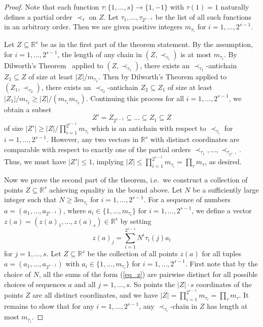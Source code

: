 \documentclass{aic}
\theoremstyle{definition}
\numberwithin{equation}{section}
\numberwithin{figure}{section}
\newcommand{\su}{\subseteq}
\begin{document}
\begin{proof}
Note that each function $\tau:\{1, \ldots, s\}\rightarrow \{1,-1\}$ with $\tau(1) = 1$ naturally defines a partial order $\prec_{\tau}$ on $Z$. Let $\tau_1, \ldots, \tau_{2^{s-1}}$ be the list of all such functions in an arbitrary order. Then we are given positive integers $m_{\tau_i}$ for $i=1,\dots,2^{s-1}$.

Let $Z \subseteq \mathbb R^s$ be as in the first part of the theorem statement. By the assumption, for $i=1,\dots,2^{s-1}$, the length of any chain in $(Z, \prec_{\tau_i})$ is at most $m_{\tau_i}$. 
 By Dilworth's Theorem~\cite{Dil} applied to $(Z, \prec_{\tau_1})$, there exists an $\prec_{\tau_1}$-antichain $Z_1 \subseteq Z$ of size at least $|Z| / m_{\tau_1}$. Then by Dilworth's Theorem applied to $(Z_1, \prec_{\tau_2})$, there exists an $\prec_{\tau_2}$-antichain $Z_2 \subseteq Z_1$ of size at least $|Z_1| / m_{\tau_2} \ge |Z|/(m_{\tau_1}m_{\tau_2})$. Continuing this process for all $i=1, \ldots, 2^{s-1}$, we obtain a subset
\[Z' = Z_{2^{s-1}} \subseteq \ldots \subseteq Z_1\su Z\]
of size $|Z'|\ge |Z|/\prod_{i=1}^{2^{s-1}} m_{\tau_i}$ which is an antichain with respect to $\prec_{\tau_i}$ for $i=1,\dots,2^{s-1}$. However, any two vectors in $\mathbb R^s$ with distinct coordinates are comparable with respect to exactly one of the partial orders $\prec_{\tau_1},\dots,\prec_{\tau_{2^{s-1}}}$. Thus, we must have $|Z'|\le 1$, implying $|Z|\le \prod_{i=1}^{2^{s-1}} m_{\tau_i}=\prod_\tau m_{\tau}$, as desired. 

Now we prove the second part of the theorem, i.e.\ we construct a collection of points $Z\su \mathbb{R}^s$ achieving equality in the bound above. Let $N$ be a sufficiently large integer such that $N\ge 3m_{\tau_i}$ for $i=1,\dots,2^{s-1}$. For a sequence of numbers $a = (a_1, \ldots, a_{2^{s-1}})$, where $a_i \in \{1, \ldots, m_{\tau_i}\}$ for $i=1, \ldots, 2^{s-1}$, we define a vector $z(a) = (z(a)_1, \ldots, z(a)_s) \in \mathbb R^s$ by setting
\begin{equation}\label{eq_z}
z(a)_j = \sum_{i=1}^{2^{s-1}} N^{i} \tau_i(j) a_{i}
\end{equation}
for $j=1,\dots,s$. Let $Z \subseteq \mathbb R^s$ be the collection of all points $z(a)$ for all tuples $a = (a_1, \ldots, a_{2^{s-1}})$ with $a_i \in \{1, \ldots, m_{\tau_i}\}$ for $i=1, \ldots, 2^{s-1}$. First note that by the choice of $N$, all the sums of the form (\ref{eq_z}) are pairwise distinct for all possible choices of sequences $a$ and all $j=1,\dots,s$. So points the $|Z|\cdot s$ coordinates of the points $Z$ are all distinct coordinates, and we have $|Z| = \prod_{i=1}^{2^{s-1}} m_{\tau_i}=\prod_\tau m_\tau$. It remains to show that for any $i = 1, \ldots, 2^{s-1}$, any $\prec_{\tau_i}$-chain in $Z$ has length at most $m_{\tau_i}$. 


\end{proof}
\end{document}
